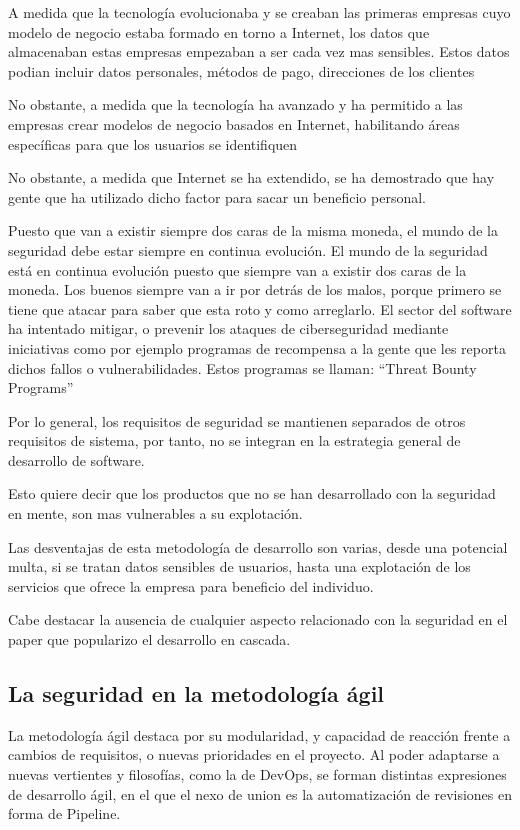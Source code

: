 \documentclass[12pt]{report} %
\begin{document}
A medida que la tecnología evolucionaba y se creaban las primeras empresas cuyo modelo de negocio estaba formado en torno a Internet, los datos que almacenaban estas empresas empezaban a ser cada vez mas sensibles.
Estos datos podian incluir datos personales, métodos de pago, direcciones de los clientes 

No obstante, a medida que la tecnología ha avanzado y ha permitido a las empresas crear modelos de negocio basados en Internet, habilitando áreas específicas para que los usuarios se identifiquen 

No obstante, a medida que Internet se ha extendido, se ha demostrado que hay gente que ha utilizado dicho factor para sacar un beneficio personal.

Puesto que van a existir siempre dos caras de la misma moneda, el mundo de la seguridad debe estar siempre en continua evolución.
El mundo de la seguridad está en continua evolución puesto que siempre van a existir dos caras de la moneda.
Los buenos siempre van a ir por detrás de los malos, porque primero se tiene que atacar para saber que esta roto y como arreglarlo.
El sector del software ha intentado mitigar, o prevenir los ataques de ciberseguridad mediante iniciativas como por ejemplo programas de recompensa a la gente que les reporta dichos fallos o vulnerabilidades.
Estos programas se llaman: ``Threat Bounty Programs''

Por lo general, los requisitos de seguridad se mantienen separados de otros requisitos de sistema, por tanto, no se integran en la estrategia general de desarrollo de software. \cite{Flec2003}

Esto quiere decir que los productos que no se han desarrollado con la seguridad en mente, son mas vulnerables a su explotación.

Las desventajas de esta metodología de desarrollo son varias, desde una potencial multa, si se tratan datos sensibles de usuarios, hasta una explotación de los servicios que ofrece la empresa para beneficio del individuo.

Cabe destacar la ausencia de cualquier aspecto relacionado con la seguridad en el paper que popularizo el desarrollo en cascada. \cite{royce1970}

\subsection{La seguridad en la metodología ágil}

La metodología ágil destaca por su modularidad, y capacidad de reacción frente a cambios de requisitos, o nuevas prioridades en el proyecto.
Al poder adaptarse a nuevas vertientes y filosofías, como la de DevOps, se forman distintas expresiones de desarrollo ágil, en el que el nexo de union es la automatización de revisiones en forma de Pipeline.
\end{document}
